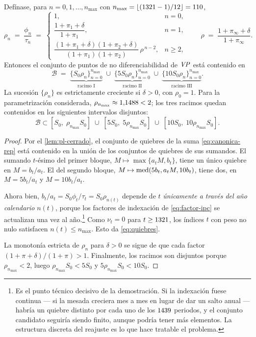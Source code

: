 \begin{theorem}
\label{thm:quiebres}
Defínase, para $n=0,1,\dots,n_{\max}$ con
$n_{\max}=\lfloor(1321-1)/12\rfloor=110$,
\[
  \rho_n \;=\; \frac{\phi_n}{\tau_n}\;=\;
  \begin{cases}
    1, & n=0,\\[2pt]
    \dfrac{1+\pi_1+\delta}{1+\pi_1}, & n=1,\\[4pt]
    \dfrac{(1+\pi_1+\delta)(1+\pi_2+\delta)}{(1+\pi_1)(1+\pi_2)}\,\rho^{\,n-2},
      & n\ge2,
  \end{cases}
  \qquad
  \rho\;=\;\frac{1+\pi_\infty+\delta}{1+\pi_\infty}.
\]
Entonces el conjunto de puntos de no diferenciabilidad de $\mathit{VP}$ está contenido en
\begin{equation}
\label{eq:quiebres}
  \mathcal{B}\;=\;\underbrace{\bigl\{S_0\rho_n\bigr\}_{n=0}^{n_{\max}}}_{\text{racimo I}}
   \;\cup\;\underbrace{\bigl\{5S_0\rho_n\bigr\}_{n=0}^{n_{\max}}}_{\text{racimo II}}
   \;\cup\;\underbrace{\bigl\{10S_0\rho_n\bigr\}_{n=0}^{n_{\max}}}_{\text{racimo III}} .
\end{equation}
La sucesión $\{\rho_n\}$ es estrictamente creciente si $\delta>0$, con
$\rho_0=1$. Para la parametrización considerada,
$\rho_{n_{\max}}\approx1{,}1488<2$; los tres racimos quedan
contenidos en los siguientes intervalos disjuntos:
\[
  \mathcal{B}\subset
  [S_0,\;\rho_{n_{\max}}S_0]\;\cup\;
  [5S_0,\;5\rho_{n_{\max}}S_0]\;\cup\;
  [10S_0,\;10\rho_{n_{\max}}S_0].
\]
\end{theorem}
\begin{proof}
Por el \cref{lem:pl-cerrado}, el conjunto de quiebres de la suma
\cref{eq:canonica-rep} está contenido en la unión de los conjuntos de quiebres de
sus sumandos. El sumando $t$-ésimo del primer bloque,
$M\mapsto\max\{a_tM,b_t\}$, tiene un único quiebre en $M=b_t/a_t$. El del segundo
bloque, $M\mapsto\operatorname{med}(5b_t,a_tM,10b_t)$, tiene dos, en $M=5b_t/a_t$ y
$M=10b_t/a_t$.

Ahora bien, $b_t/a_t = S_0\phi_t/\tau_t = S_0\rho_{n(t)}$ depende de $t$
\emph{únicamente a través del año calendario} $n(t)$, porque los factores de
indexación de \cref{eq:factor-ipc} se actualizan una vez al año.\footnote{Es el punto técnico decisivo de la demostración. Si la indexación fuese continua --- si la mesada creciera mes a mes en lugar de dar un salto anual --- habría un quiebre distinto por cada uno de los $1439$ periodos, y el conjunto candidato seguiría siendo finito, aunque podría tener más elementos. La estructura discreta del reajuste es lo que hace tratable el problema.} Como
$\nu_t=0$ para $t\ge1321$, los índices $t$ con peso no nulo
satisfacen $n(t)\le n_{\max}$. Esto da \cref{eq:quiebres}.

La monotonía estricta de $\rho_n$ para $\delta>0$ se sigue de que cada factor
$(1+\pi+\delta)/(1+\pi)>1$. Finalmente, los racimos son disjuntos porque
$\rho_{n_{\max}}<2$, luego
$\rho_{n_{\max}}S_0<5S_0$ y $5\rho_{n_{\max}}S_0<10S_0$.
\end{proof}


